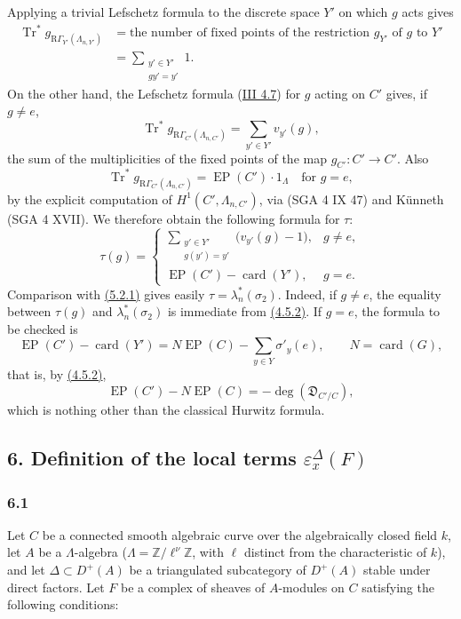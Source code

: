 \documentclass[11pt]{article}
\providecommand{\Tr}{\operatorname{Tr}}
\providecommand{\EP}{\operatorname{EP}}
\providecommand{\Tr}{\operatorname{Tr}}
\providecommand{\Tr}{\operatorname{Tr}}
\providecommand{\Tr}{\operatorname{Tr}}
\providecommand{\EP}{\operatorname{EP}}
\providecommand{\RG}{\mathrm R\Gamma}
\providecommand{\Tr}{\operatorname{Tr}}
\begin{document}
Applying a trivial Lefschetz formula to the discrete space $Y'$ on which $g$ acts gives
\[
\begin{aligned}
\Tr^*g_{\RG_{Y'}(\Lambda_{n,Y'})}
&=\text{the number of fixed points of the restriction $g_{Y'}$ of $g$ to $Y'$}\\
&=\sum_{\substack{y'\in Y'\\gy'=y'}}1.
\end{aligned}
\]
On the other hand, the Lefschetz formula (\hyperref[sga5:III:corollary:4.7]{III 4.7}) for $g$ acting on $C'$ gives, if $g\ne e$,
\[
\Tr^*g_{\RG_{C'}(\Lambda_{n,C'})}
=
\sum_{y'\in Y'} v_{y'}(g),
\]
the sum of the multiplicities of the fixed points of the map $g_{C'}:C'\to C'$. Also
\[
\Tr^*g_{\RG_{C'}(\Lambda_{n,C'})}=\EP(C')\cdot1_\Lambda
\quad\text{for }g=e,
\]
by the explicit computation of $H^1(C',\Lambda_{n,C'})$, via (SGA 4 IX 47) and Künneth (SGA 4 XVII). We therefore obtain the following formula for $\tau$:
\[
\tau(g)=
\begin{cases}
\displaystyle\sum_{\substack{y'\in Y'\\g(y')=y'}}\bigl(v_{y'}(g)-1\bigr),& g\ne e,\\[0.8em]
\EP(C')-\operatorname{card}(Y'),& g=e.
\end{cases}
\tag{5.2.2}\label{sga5:X:equation:5.2.2}
\]
Comparison with \hyperref[sga5:X:equation:5.2.1]{(5.2.1)} gives easily $\tau=\lambda_n^*(\sigma_2)$. Indeed, if $g\ne e$, the equality between $\tau(g)$ and $\lambda_n^*(\sigma_2)$ is immediate from \hyperref[sga5:X:equation:4.5.2]{(4.5.2)}. If $g=e$, the formula to be checked is
\[
\EP(C')-\operatorname{card}(Y')
=
N\EP(C)-\sum_{y\in Y}\sigma'_y(e),
\qquad N=\operatorname{card}(G),
\]
that is, by \hyperref[sga5:X:equation:4.5.2]{(4.5.2)},
\[
\EP(C')-N\EP(C)=-\deg(\mathfrak D_{C'/C}),
\]
which is nothing other than the classical Hurwitz formula.

\subsection*{6. Definition of the local terms $\varepsilon_x^\Delta(F)$}\label{sga5:X:subsection:6}

\subsubsection*{6.1}\label{sga5:X:subsubsection:6.1}

Let $C$ be a connected smooth algebraic curve over the algebraically closed field $k$, let $A$ be a $\Lambda$-algebra ($\Lambda=\mathbb Z/\ell^\nu\mathbb Z$, with $\ell$ distinct from the characteristic of $k$), and let $\Delta\subset D^+(A)$ be a triangulated subcategory of $D^+(A)$ stable under direct factors. Let $F$ be a complex of sheaves of $A$-modules on $C$ satisfying the following conditions:
\end{document}
